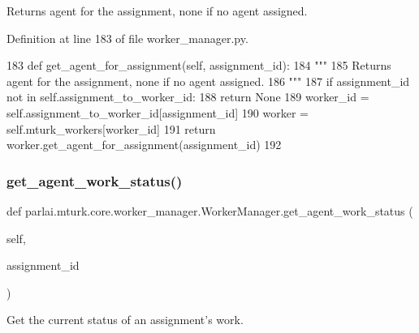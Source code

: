 \begin{DoxyVerb}Returns agent for the assignment, none if no agent assigned.
\end{DoxyVerb}
 

Definition at line 183 of file worker\+\_\+manager.\+py.


\begin{DoxyCode}
183     \textcolor{keyword}{def }get\_agent\_for\_assignment(self, assignment\_id):
184         \textcolor{stringliteral}{"""}
185 \textcolor{stringliteral}{        Returns agent for the assignment, none if no agent assigned.}
186 \textcolor{stringliteral}{        """}
187         \textcolor{keywordflow}{if} assignment\_id \textcolor{keywordflow}{not} \textcolor{keywordflow}{in} self.assignment\_to\_worker\_id:
188             \textcolor{keywordflow}{return} \textcolor{keywordtype}{None}
189         worker\_id = self.assignment\_to\_worker\_id[assignment\_id]
190         worker = self.mturk\_workers[worker\_id]
191         \textcolor{keywordflow}{return} worker.get\_agent\_for\_assignment(assignment\_id)
192 
\end{DoxyCode}
\mbox{\label{classparlai_1_1mturk_1_1core_1_1worker__manager_1_1WorkerManager_add7bab97c8116b679d516564c9cf0f6d}} 
\subsubsection{\texorpdfstring{get\+\_\+agent\+\_\+work\+\_\+status()}{get\_agent\_work\_status()}}
{\footnotesize\ttfamily def parlai.\+mturk.\+core.\+worker\+\_\+manager.\+Worker\+Manager.\+get\+\_\+agent\+\_\+work\+\_\+status (\begin{DoxyParamCaption}\item[{}]{self,  }\item[{}]{assignment\+\_\+id }\end{DoxyParamCaption})}

\begin{DoxyVerb}Get the current status of an assignment's work.
\end{DoxyVerb}
 

